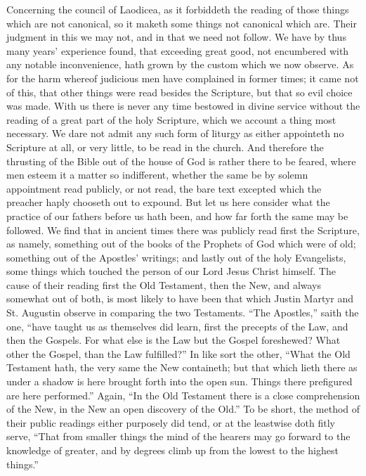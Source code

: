 Concerning the council of Laodicea, as it forbiddeth the reading of those things which are not canonical, so it maketh some things not canonical which are. Their judgment in this we may not, and in that we need not follow.
We have by thus many years’ experience found, that exceeding great good, not encumbered with any notable inconvenience, hath grown by the custom which we now observe. As for the harm whereof judicious men have complained in former times; it came not of this, that other things were read besides the Scripture, but that so evil choice was made. With us there is never any time bestowed in divine service without the reading of a great part of the holy Scripture, which we account a thing most necessary. We dare not admit any such form of liturgy as either appointeth no Scripture at all, or very little, to be read in the church. And therefore the thrusting of the Bible out of the house of God is rather there to be feared, where men esteem it a matter so indifferent, whether the same be by solemn appointment read publicly, or not read, the bare text excepted which the preacher haply chooseth out to expound.
But let us here consider what the practice of our fathers before us hath been, and how far forth the same may be followed. We find that in ancient times there was publicly read first the Scripture, as namely, something out of the books of the Prophets of God which were of old; something out of the Apostles’ writings; and lastly out of the holy Evangelists, some things which touched the person  of our Lord Jesus Christ himself. The cause of their reading first the Old Testament, then the New, and always somewhat out of both, is most likely to have been that which Justin Martyr and St. Augustin observe in comparing the two Testaments. “The Apostles,” saith the one, “have taught us as themselves did learn, first the precepts of the Law, and then the Gospels. For what else is the Law but the Gospel foreshewed? What other the Gospel, than the Law fulfilled?” In like sort the other, “What the Old Testament hath, the very same the New containeth; but that which lieth there as under a shadow is here brought forth into the open sun. Things there prefigured are here performed.” Again, “In the Old Testament there is a close comprehension of the New, in the New an open discovery of the Old.” To be short,  the method of their public readings either purposely did tend, or at the leastwise doth fitly serve, “That from smaller things the mind of the hearers may go forward to the knowledge of greater, and by degrees climb up from the lowest to the highest things.”
